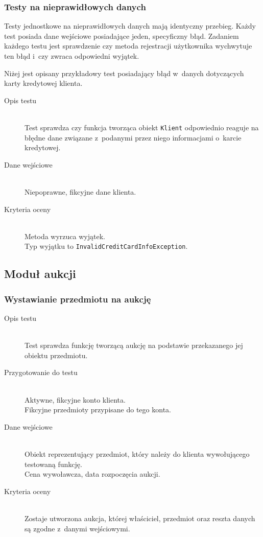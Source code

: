 \documentclass[10pt,a4paper]{article}
\newcommand{\f}[1]{\texttt{#1}}
\begin{document}
\subsubsection{Testy na nieprawidłowych danych}
Testy jednostkowe na nieprawidłowych danych mają identyczny przebieg. Każdy
test posiada dane wejściowe posiadające jeden, specyficzny błąd. Zadaniem
każdego testu jest sprawdzenie czy metoda rejestracji użytkownika wychwytuje
ten błąd i~czy zwraca odpowiedni wyjątek.

Niżej jest opisany przykładowy test posiadający błąd w~danych dotyczących karty
kredytowej klienta.

\begin{description}
  \item[Opis testu] \hfill \\
    Test sprawdza czy funkcja tworząca obiekt \f{Klient} odpowiednio reaguje na
    błędne dane związane z~podanymi przez niego informacjami o~karcie kredytowej.
  \item[Dane wejściowe] \hfill \\
    Niepoprawne, fikcyjne dane klienta.
  \item[Kryteria oceny] \hfill \\
    Metoda wyrzuca wyjątek.\\
    Typ wyjątku to \f{InvalidCreditCardInfoException}.
\end{description}

\subsection{Moduł aukcji}

\subsubsection{Wystawianie przedmiotu na aukcję}
\begin{description}
  \item[Opis testu] \hfill \\
    Test sprawdza funkcję tworzącą aukcję na podstawie przekazanego jej obiektu
    przedmiotu.
  \item[Przygotowanie do testu] \hfill \\
    Aktywne, fikcyjne konto klienta.\\
    Fikcyjne przedmioty przypisane do tego konta.
  \item[Dane wejściowe] \hfill \\
    Obiekt reprezentujący przedmiot, który należy do klienta wywołującego
    testowaną funkcję.\\
    Cena wywoławcza, data rozpoczęcia aukcji.
  \item[Kryteria oceny] \hfill \\
    Zostaje utworzona aukcja, której właściciel, przedmiot oraz reszta danych
    są zgodne z~danymi wejściowymi.
\end{description}
\end{document}
